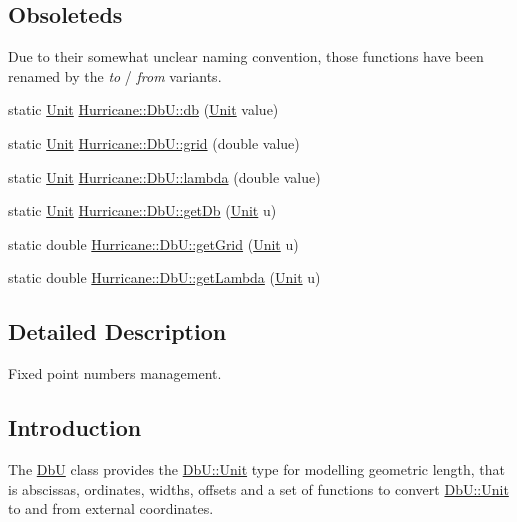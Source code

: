 \subsection*{Obsoleteds}
\label{_amgrpf05125b8b6a468721054b36b1a1cfd62}%
 Due to their somewhat unclear naming convention, those functions have been renamed by the {\itshape to} / {\itshape from} variants. \begin{DoxyCompactItemize}
\item 
static \mbox{\hyperlink{group__DbUGroup_ga4fbfa3e8c89347af76c9628ea06c4146}{Unit}} \mbox{\hyperlink{group__DbUGroup_gacd77957381fb93fc4203bdca215e0b48}{Hurricane\+::\+Db\+U\+::db}} (\mbox{\hyperlink{group__DbUGroup_ga4fbfa3e8c89347af76c9628ea06c4146}{Unit}} value)
\item 
static \mbox{\hyperlink{group__DbUGroup_ga4fbfa3e8c89347af76c9628ea06c4146}{Unit}} \mbox{\hyperlink{group__DbUGroup_ga1d4bac6e3b68c8cd44b345de3b425753}{Hurricane\+::\+Db\+U\+::grid}} (double value)
\item 
static \mbox{\hyperlink{group__DbUGroup_ga4fbfa3e8c89347af76c9628ea06c4146}{Unit}} \mbox{\hyperlink{group__DbUGroup_gaa1ba98acc939ff1c370c18544a5e0dce}{Hurricane\+::\+Db\+U\+::lambda}} (double value)
\item 
static \mbox{\hyperlink{group__DbUGroup_ga4fbfa3e8c89347af76c9628ea06c4146}{Unit}} \mbox{\hyperlink{group__DbUGroup_ga4233772b1b3e68f3ec723c7509ea87ff}{Hurricane\+::\+Db\+U\+::get\+Db}} (\mbox{\hyperlink{group__DbUGroup_ga4fbfa3e8c89347af76c9628ea06c4146}{Unit}} u)
\item 
static double \mbox{\hyperlink{group__DbUGroup_gad4485d0d7b5fd7ae87b32f165155c0a2}{Hurricane\+::\+Db\+U\+::get\+Grid}} (\mbox{\hyperlink{group__DbUGroup_ga4fbfa3e8c89347af76c9628ea06c4146}{Unit}} u)
\item 
static double \mbox{\hyperlink{group__DbUGroup_gadea6b9a6e84243f70f3a5e2725b2c6d8}{Hurricane\+::\+Db\+U\+::get\+Lambda}} (\mbox{\hyperlink{group__DbUGroup_ga4fbfa3e8c89347af76c9628ea06c4146}{Unit}} u)
\end{DoxyCompactItemize}


\subsection{Detailed Description}
Fixed point numbers management. 

\hypertarget{group__DbUGroup_secDbUIntro}{}\subsection{Introduction}\label{group__DbUGroup_secDbUIntro}
The \mbox{\hyperlink{classHurricane_1_1DbU}{DbU}} class provides the \mbox{\hyperlink{group__DbUGroup_ga4fbfa3e8c89347af76c9628ea06c4146}{Db\+U\+::\+Unit}} type for modelling geometric length, that is abscissas, ordinates, widths, offsets and a set of functions to convert \mbox{\hyperlink{group__DbUGroup_ga4fbfa3e8c89347af76c9628ea06c4146}{Db\+U\+::\+Unit}} to and from external coordinates.

